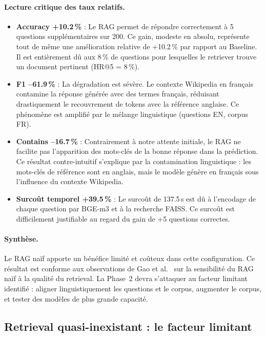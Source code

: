 \documentclass[12pt,a4paper]{article}
\begin{document}
\paragraph{Lecture critique des taux relatifs.}
\begin{itemize}[leftmargin=*]
  \item \textbf{Accuracy +10.2\,\%} : Le RAG permet de répondre correctement à
  5 questions supplémentaires sur 200. Ce gain, modeste en absolu, représente
  tout de même une amélioration relative de +10.2\,\% par rapport au Baseline.
  Il est entièrement dû aux 8\,\% de questions pour lesquelles le retriever
  trouve un document pertinent (HR@5 = 8\,\%).

  \item \textbf{F1 --61.9\,\%} : La dégradation est sévère.
  Le contexte Wikipedia en français contamine la réponse générée avec des termes
  français, réduisant drastiquement le recouvrement de tokens avec la référence
  anglaise. Ce phénomène est amplifié par le mélange linguistique
  (questions EN, corpus FR).

  \item \textbf{Contains --16.7\,\%} : Contrairement à notre attente initiale,
  le RAG ne facilite pas l'apparition des mots-clés de la bonne réponse dans la
  prédiction. Ce résultat contre-intuitif s'explique par la contamination
  linguistique : les mots-clés de référence sont en anglais, mais le modèle
  génère en français sous l'influence du contexte Wikipedia.

  \item \textbf{Surcoût temporel +39.5\,\%} : Le surcoût de 137.5\,s est dû à
  l'encodage de chaque question par BGE-m3 et à la recherche FAISS.
  Ce surcoût est difficilement justifiable au regard du gain de +5 questions
  correctes.
\end{itemize}

\paragraph{Synthèse.}
Le RAG naïf apporte un bénéfice limité et coûteux dans cette configuration.
Ce résultat est conforme aux observations de Gao et al.~\cite{gao2023ragsurvey}
sur la sensibilité du RAG naïf à la qualité du retrieval. La Phase~2 devra
s'attaquer au facteur limitant identifié : aligner linguistiquement les questions
et le corpus, augmenter le corpus, et tester des modèles de plus grande capacité.


\subsection{Retrieval quasi-inexistant : le facteur limitant}
\end{document}
